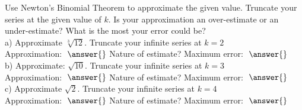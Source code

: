 \documentclass[handout]{ximera}
\begin{document}
\begin{problem} Use Newton's Binomial Theorem to approximate the given value. Truncate your series at the given value of $k$.
 Is your approximation an over-estimate or an under-estimate? What is the most your error could be?\\
a) Approximate $\sqrt[3]{12}$. Truncate your infinite series at $k = 2$ \\
Approximation: $\; \answer{}$ Nature of estimate? 
  Maximum error: $\; \answer{}$\\
b) Approximate: $\sqrt{10}$. Truncate your infinite series at $k = 3$ \\ 
Approximation: $\; \answer{}$ Nature of estimate? 
Maximum error: $\; \answer{}$\\
c) Approximate $\sqrt{2}$. Truncate your infinite series at $k = 4$ \\ 
Approximation: $\; \answer{}$ Nature of estimate? 
Maximum error: $\; \answer{}$\\


\end{problem}
\end{document}
